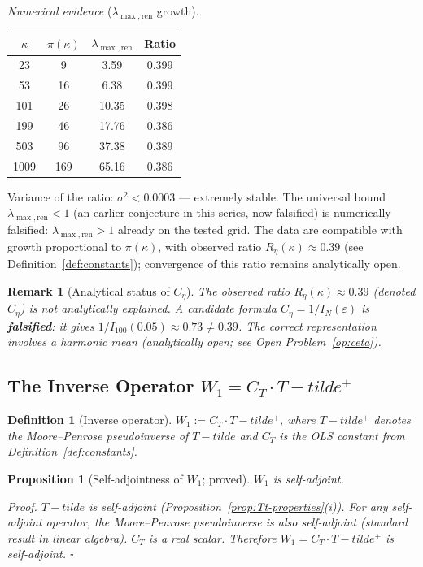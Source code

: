 \documentclass[11pt]{article}
\def\Tt{T-tilde}%
\newtheorem{proposition}[theorem]{Proposition}
\newtheorem{definition}[theorem]{Definition}
\newtheorem*{remark}{Remark}
\newcommand{\Tt}{\widetilde{T}}
\newcommand{\Ceta}{C_{\eta}}
\newcommand{\CT}{C_{T}}
\newcommand{\Wone}{W_1}
\begin{document}
\emph{Numerical evidence} ($\lambda_{\max,\mathrm{ren}}$ growth).

\begin{center}
\begin{tabular}{cccc}
\toprule
$\kappa$ & $\pi(\kappa)$ & $\lambda_{\max,\mathrm{ren}}$ & Ratio \\
\midrule
23  & 9   & 3.59  & 0.399 \\
53  & 16  & 6.38  & 0.399 \\
101 & 26  & 10.35 & 0.398 \\
199 & 46  & 17.76 & 0.386 \\
503 & 96  & 37.38 & 0.389 \\
1009 & 169 & 65.16 & 0.386 \\
\bottomrule
\end{tabular}
\end{center}

Variance of the ratio: $\sigma^2 < 0.0003$ --- extremely stable.
The universal bound $\lambda_{\max,\mathrm{ren}} < 1$
(an earlier conjecture in this series, now falsified) is numerically falsified:
$\lambda_{\max,\mathrm{ren}} > 1$ already on the tested grid.
The data are compatible with growth proportional to $\pi(\kappa)$,
with observed ratio $R_\eta(\kappa)\approx 0.39$ (see Definition~\ref{def:constants});
convergence of this ratio remains analytically open.

\begin{remark}[Analytical status of $\Ceta$]
The observed ratio $R_\eta(\kappa)\approx 0.39$ (denoted $\Ceta$)
is not analytically explained.
A candidate formula $\Ceta = 1/I_N(\varepsilon)$ is \textbf{falsified}:
it gives $1/I_{100}(0.05)\approx 0.73\neq 0.39$.
The correct representation involves a harmonic mean
(analytically open; see Open Problem~\ref{op:ceta}).
\end{remark}

\subsection{The Inverse Operator $\Wone = \CT\cdot\Tt^+$}

\begin{definition}[Inverse operator]
$\Wone := \CT\cdot\Tt^+$,
where $\Tt^+$ denotes the Moore--Penrose pseudoinverse of $\Tt$
and $\CT$ is the OLS constant from Definition~\ref{def:constants}.
\end{definition}

\begin{proposition}[Self-adjointness of $\Wone$; proved]\label{prop:W1-sa}
$\Wone$ is self-adjoint.

\emph{Proof.}
$\Tt$ is self-adjoint (Proposition~\ref{prop:Tt-properties}(i)).
For any self-adjoint operator, the Moore--Penrose pseudoinverse is also
self-adjoint (standard result in linear algebra).
$\CT$ is a real scalar.
Therefore $\Wone = \CT\cdot\Tt^+$ is self-adjoint. $\square$
\end{proposition}
\end{document}
